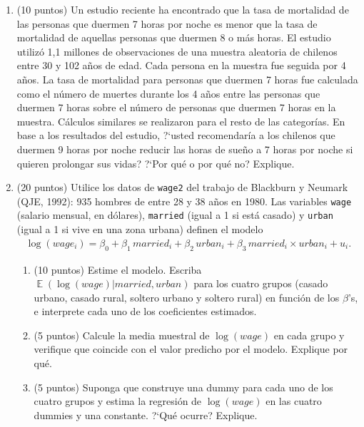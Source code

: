 \documentclass[letterpaper,11pt]{article}
\theoremstyle{plain}
\theoremstyle{definition}
\theoremstyle{remark}
\DeclareMathOperator{\E}{\mathbb{E}}
\begin{document}
\begin{enumerate}
    \item (10 puntos) Un estudio reciente ha encontrado que la tasa de mortalidad de las
        personas que duermen 7 horas por noche es menor que la tasa de mortalidad de
        aquellas personas que duermen 8 o m\'as horas. El estudio utiliz\'o 1,1 millones de
        observaciones de una muestra aleatoria de chilenos entre 30 y 102 a\~nos de edad. Cada
        persona en la muestra fue seguida por 4 a\~nos. La tasa de mortalidad para personas que
        duermen 7 horas fue calculada como el n\'umero de muertes durante los 4 a\~nos entre las
        personas que duermen 7 horas sobre el n\'umero de personas que duermen 7 horas en la
        muestra. C\'alculos similares se realizaron para el resto de las categor\'ias. En base a
        los resultados del estudio, ?`usted recomendar\'ia a los chilenos que duermen 9 horas por
        noche reducir las horas de sue\~no a 7 horas por noche si quieren prolongar sus
        vidas? ?`Por qu\'e o por qu\'e no? Explique.

    \item (20 puntos) Utilice los datos de \texttt{wage2} del trabajo de Blackburn y
        Neumark (QJE, 1992): 935 hombres de entre 28 y 38 a\~nos en 1980. Las variables
        \texttt{wage} (salario mensual, en d\'olares), \texttt{married} (igual a 1 si est\'a
        casado) y \texttt{urban} (igual a 1 si vive en una zona urbana) definen el modelo
        \begin{align*}
        \log(wage_i)=\beta_0+\beta_1 \, married_i+\beta_2 \, urban_i+\beta_3 \, married_i\times urban_i+u_i.
        \end{align*}
        \begin{enumerate}
            \item (10 puntos) Estime el modelo. Escriba $\E(\log(wage)|married,urban)$ para
                los cuatro grupos (casado urbano, casado rural, soltero urbano y soltero rural)
                en funci\'on de los $\beta$'s, e interprete cada uno de los coeficientes
                estimados.
            \item (5 puntos) Calcule la media muestral de $\log(wage)$ en cada grupo y
                verifique que coincide con el valor predicho por el modelo. Explique por qu\'e.
            \item (5 puntos) Suponga que construye una dummy para cada uno de los cuatro grupos
                y estima la regresi\'on de $\log(wage)$ en las cuatro dummies y una constante.
                ?`Qu\'e ocurre? Explique.
        \end{enumerate}


\end{enumerate}
\end{document}
